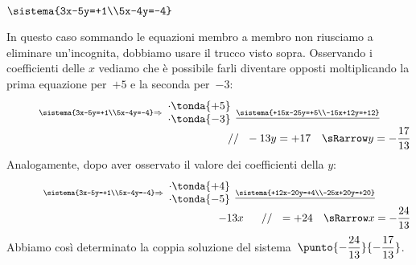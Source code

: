  \begin{esempio}
\(\sistema{3x-5y=+1\\5x-4y=-4}\)

In questo caso sommando le equazioni membro a membro non riusciamo a 
eliminare un'incognita, dobbiamo usare il trucco visto sopra.
Osservando i coefficienti delle \(x\) vediamo che è possibile farli diventare 
opposti moltiplicando la prima equazione per~\(+5\) e la seconda per~\(-3\):
\[\stackrel{\sistema{3x-5y=+1\\5x-4y=-4}\Rightarrow
  \begin{array}{l}\cdot \tonda{+5}\\ \cdot \tonda{-3}\end{array}
  \underline{\sistema{+15x-25y=+5\\-15x+12y=+12}}}
  {\qquad \qquad \qquad \qquad \qquad \qquad \qquad \qquad \qquad \qquad 
   // ~~ -13y  =+17 \quad \sRarrow y=-\frac{17}{13}}\]
Analogamente, dopo aver osservato il valore dei coefficienti della \(y\):
\[\stackrel{\sistema{3x-5y=+1\\5x-4y=-4}\Rightarrow
  \begin{array}{l}\cdot \tonda{+4}\\ \cdot \tonda{-5}\end{array}
  \underline{\sistema{+12x-20y=+4\\-25x+20y=+20}}}
  {\qquad \qquad \qquad \qquad \qquad \qquad \qquad \qquad \qquad 
   ~~~~~ -13x ~~~~~ // ~~ =+24 \quad \sRarrow x=-\frac{24}{13}}\]
Abbiamo così determinato la coppia soluzione del 
sistema~\(\punto{-\dfrac{24}{13}}{-\dfrac{17}{13}}\).

 \end{esempio}

